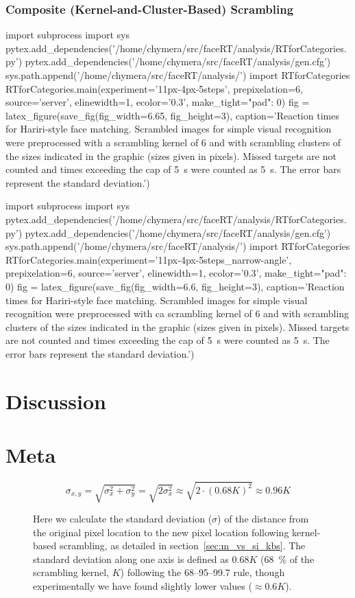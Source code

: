 	\subsection{Composite (Kernel-and-Cluster-Based) Scrambling}\label{sec:r_pe_cs}
	    \begin{pycode}
		import subprocess
		import sys
		pytex.add_dependencies('/home/chymera/src/faceRT/analysis/RTforCategories.py')
		pytex.add_dependencies('/home/chymera/src/faceRT/analysis/gen.cfg')
		sys.path.append('/home/chymera/src/faceRT/analysis/')
		import RTforCategories
		RTforCategories.main(experiment='11px-4px-5steps', prepixelation=6, source='server', elinewidth=1, ecolor='0.3', make_tight={"pad": 0})
		fig = latex_figure(save_fig(fig_width=6.65, fig_height=3), caption='Reaction times for Hariri-style face matching. Scrambled images for simple visual recognition were preprocessed with a scrambling kernel of \SI{6}{\pixel} and with scrambling clusters of the sizes indicated in the graphic (sizes given in pixels). Missed targets are not counted and times exceeding the cap of \SI{5}{\second} were counted as \SI{5}{\second}. The error bars represent the standard deviation.')
	    \end{pycode}
	    \py{fig}
	    \begin{pycode}
		import subprocess
		import sys
		pytex.add_dependencies('/home/chymera/src/faceRT/analysis/RTforCategories.py')
		pytex.add_dependencies('/home/chymera/src/faceRT/analysis/gen.cfg')
		sys.path.append('/home/chymera/src/faceRT/analysis/')
		import RTforCategories
		RTforCategories.main(experiment='11px-4px-5steps_narrow-angle', prepixelation=6, source='server', elinewidth=1, ecolor='0.3', make_tight={"pad": 0})
		fig = latex_figure(save_fig(fig_width=6.6, fig_height=3), caption='Reaction times for Hariri-style face matching. Scrambled images for simple visual recognition were preprocessed with ca scrambling kernel of \SI{6}{\pixel} and with scrambling clusters of the sizes indicated in the graphic (sizes given in pixels). Missed targets are not counted and times exceeding the cap of \SI{5}{\second} were counted as \SI{5}{\second}. The error bars represent the standard deviation.')
	    \end{pycode}
\chapter{Discussion}
\chapter{Meta}
    \begin{figure}
	\[ \sigma_{x,y} = \sqrt{\sigma_{x}^{2}+\sigma_{y}^{2}} = \sqrt{2\sigma_{x}^{2}} \approx \sqrt{2 \cdot (0.68 K)^{2}} \approx 0.96K\]
	\caption{Here we calculate the standard deviation ($\sigma$) of the distance from the original pixel location to the new pixel location following kernel-based scrambling, as detailed in section~\ref{sec:m_vs_si_kbs}. The standard deviation along one axis is defined as $0.68K$ (\SI{68}{\percent} of the scrambling kernel, $K$) following the 68–95–99.7 rule, though experimentally we have found slightly lower values ($\approx 0.6K$).}\label{eq:lrgn}
    \end{figure}

